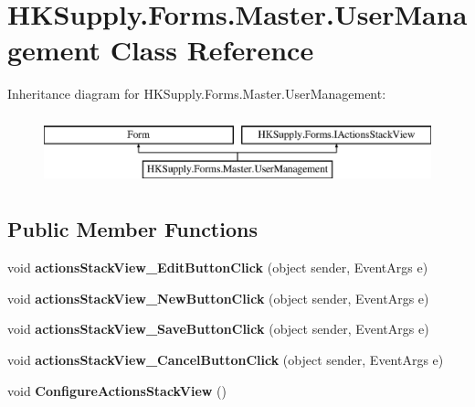 \hypertarget{class_h_k_supply_1_1_forms_1_1_master_1_1_user_management}{}\section{H\+K\+Supply.\+Forms.\+Master.\+User\+Management Class Reference}
\label{class_h_k_supply_1_1_forms_1_1_master_1_1_user_management}
Inheritance diagram for H\+K\+Supply.\+Forms.\+Master.\+User\+Management\+:\begin{figure}[H]
\begin{center}
\leavevmode
\includegraphics[height=2.000000cm]{class_h_k_supply_1_1_forms_1_1_master_1_1_user_management}
\end{center}
\end{figure}
\subsection*{Public Member Functions}
\begin{DoxyCompactItemize}
\item 
\mbox{\label{class_h_k_supply_1_1_forms_1_1_master_1_1_user_management_a6af4060ab989941e08d01b4dfa674ada}} 
void {\bfseries actions\+Stack\+View\+\_\+\+Edit\+Button\+Click} (object sender, Event\+Args e)
\item 
\mbox{\label{class_h_k_supply_1_1_forms_1_1_master_1_1_user_management_a1fa53bdd2a95798e874167e333294520}} 
void {\bfseries actions\+Stack\+View\+\_\+\+New\+Button\+Click} (object sender, Event\+Args e)
\item 
\mbox{\label{class_h_k_supply_1_1_forms_1_1_master_1_1_user_management_abbad8b29b95cc3352c4a55f7cfbf2742}} 
void {\bfseries actions\+Stack\+View\+\_\+\+Save\+Button\+Click} (object sender, Event\+Args e)
\item 
\mbox{\label{class_h_k_supply_1_1_forms_1_1_master_1_1_user_management_a812df0823003cc8a80516aee863190a9}} 
void {\bfseries actions\+Stack\+View\+\_\+\+Cancel\+Button\+Click} (object sender, Event\+Args e)
\item 
\mbox{\label{class_h_k_supply_1_1_forms_1_1_master_1_1_user_management_a276207364c74bbbfd746980cdd9b9f7d}} 
void {\bfseries Configure\+Actions\+Stack\+View} ()
\end{DoxyCompactItemize}
